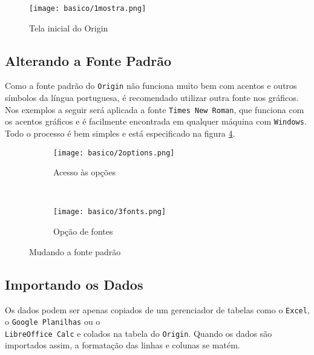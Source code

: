 \begin{figure}[H]
    \centering
    \texttt{[image: basico/1mostra.png]}

    \caption{Tela inicial do Origin}
    \label{fig:basico:mostragem}
\end{figure}

\subsection{Alterando a Fonte Padrão}

    Como a fonte padrão do \texttt{Origin} não funciona muito bem com acentos e outros símbolos da língua portuguesa, é recomendado utilizar outra fonte nos gráficos. Nos exemplos a seguir será aplicada a fonte \texttt{Times New Roman}, que funciona com os acentos gráficos e é facilmente encontrada em qualquer máquina com \texttt{Windows}. Todo o processo é bem simples e está especificado na figura \ref{fig:basico:mudar_fontes}.

    \begin{figure}[htbp]
        \centering
        \begin{subfigure}{0.45\textwidth}
            \centering
            \texttt{[image: basico/2options.png]}

            \caption{Acesso às opções}
            \label{fig:basico:options}
        \end{subfigure}
        ~
        \begin{subfigure}{0.45\textwidth}
            \centering
            \texttt{[image: basico/3fonts.png]}

            \caption{Opção de fontes}
            \label{fig:basico:fontes}
        \end{subfigure}
        \caption{Mudando a fonte padrão}
        \label{fig:basico:mudar_fontes}
    \end{figure}


\subsection{Importando os Dados}

    Os dados podem ser apenas copiados de um gerenciador de tabelas como o \texttt{Excel}, o \texttt{Google Planilhas} ou o \\\texttt{LibreOffice Calc} e colados na tabela do \texttt{Origin}. Quando os dados são importados assim, a formatação das linhas e colunas se matém.

